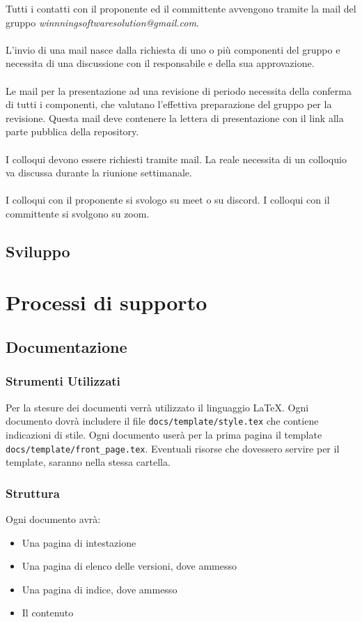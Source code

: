 \documentclass[a4paper, 12pt]{article}
\begin{document}
Tutti i contatti con il proponente ed il committente avvengono tramite la mail del gruppo \textit{winnningsoftwaresolution@gmail.com}.\\\\
L'invio di una mail nasce dalla richiesta di uno o più componenti del gruppo e necessita di una discussione con il responsabile e della sua approvazione.\\\\
Le mail per la presentazione ad una revisione di periodo necessita della conferma di tutti i componenti, che valutano l'effettiva preparazione del gruppo per la revisione. Questa mail deve contenere la lettera di presentazione con il link alla parte pubblica della repository.\\\\
I colloqui devono essere richiesti tramite mail. La reale necessita di un colloquio va discussa durante la riunione settimanale.\\\\
I colloqui con il proponente si svologo su meet o su discord. I colloqui con il committente si svolgono su zoom.
\subsection{Sviluppo}

\section{Processi di supporto}
\subsection{Documentazione}
\subsubsection{Strumenti Utilizzati}
Per la stesure dei documenti verrà utilizzato il linguaggio \LaTeX.
Ogni documento dovrà includere il file \texttt{docs/template/style.tex} che contiene indicazioni di stile.
Ogni documento userà per la prima pagina il template \texttt{docs/template/front\_page.tex}.
Eventuali risorse che dovessero servire per il template, saranno nella stessa cartella.
\subsubsection{Struttura}
Ogni documento avrà:
\begin{itemize}
\item Una pagina di intestazione
\item Una pagina di elenco delle versioni, dove ammesso
\item Una pagina di indice, dove ammesso
\item Il contenuto
\end{itemize}
\end{document}
